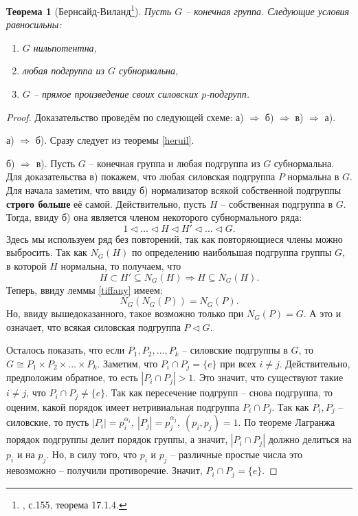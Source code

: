 \documentclass{article}
\newtheorem{theorem}{Теорема}[section]
\begin{document}
\begin{theorem}[Бернсайд-Виланд\footnote{\cite{kargapolov}, с.155, теорема 17.1.4.}]
    Пусть $G$ -- конечная группа. Следующие условия равносильны:
    \begin{enumerate}
        \item[(а)] $G$ нильпотентна,
        \item[(б)] любая подгруппа из $G$ субнормальна,
        \item[(в)] $G$ -- прямое произведение своих силовских $p$-подгрупп.
    \end{enumerate}
\end{theorem}
\begin{proof}
    Доказательство проведём по следующей схеме: а) $\Rightarrow$ б) $\Rightarrow$ в) $\Rightarrow$ а).

    а) $\Rightarrow$ б). Сразу следует из теоремы \ref{heruil}.

    б) $\Rightarrow$ в). Пусть $G$ -- конечная группа и любая подгруппа из $G$ субнормальна. Для доказательства в) покажем, что любая силовская подгруппа $P$ нормальна в $G$. Для начала заметим, что ввиду б) нормализатор всякой собственной подгруппы \textbf{строго больше} её самой. Действительно, пусть $H$ -- собственная подгруппа в $G$. Тогда, ввиду б) она является членом некоторого субнормального ряда:
    \[
        1 \triangleleft \ldots \triangleleft H \triangleleft H' \triangleleft \ldots \triangleleft G.
    \]
    Здесь мы используем ряд без повторений, так как повторяющиеся члены можно выбросить. Так как $N_G(H)$ по определению наибольшая подгруппа группы $G$, в которой $H$ нормальна, то получаем, что $$ H \subset H' \subseteq N_G(H) \Rightarrow H \subseteq N_G(H). $$
    Теперь, ввиду леммы \ref{tiffany} имеем: $$ N_G(N_G(P)) = N_G(P). $$ Но, ввиду вышедоказанного, такое возможно только при $N_G(P) = G$. А это и означает, что всякая силовская подгруппа $P \triangleleft G$.

    Осталось показать, что если $P_1, P_2, \ldots, P_k$ -- силовские подгруппы в $G$, то $G \cong P_1 \times P_2 \times \ldots \times P_k$.
    Заметим, что $P_i \cap P_j = \{ e \}$ при всех $i \neq j$. Действительно, предположим обратное, то есть $|P_i \cap P_j| > 1$. Это значит, что существуют такие $i \neq j$, что $P_i \cap P_j \neq \{ e \}$. Так как пересечение подгрупп -- снова подгруппа, то оценим, какой порядок имеет нетривиальная подгруппа $P_i \cap P_j$. Так как $P_i, P_j$ -- силовские, то пусть $|P_i| = p_i^{\alpha_i}, \ |P_j| = p_j^{\alpha_j}, \ (p_i, p_j) = 1$. По теореме Лагранжа порядок подгруппы делит порядок группы, а значит, $|P_i \cap P_j|$ должно делиться на $p_i$ и на $p_j$. Но, в силу того, что $p_i$ и $p_j$ -- различные простые числа это невозможно -- получили противоречие. Значит, $P_i \cap P_j = \{ e \}$.
    

\end{proof}
\end{document}
